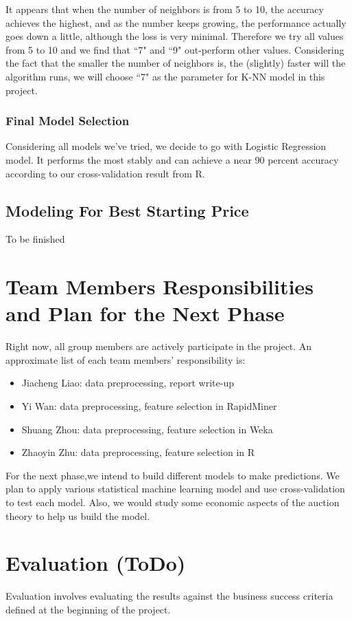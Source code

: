 \documentclass[CEJM,PDF]{cej} %
\begin{document}
It appears that when the number of neighbors is from 5 to 10, the accuracy achieves the highest, and as the number keeps growing, the performance actually goes down a little, although the loss is very minimal. Therefore we try all values from 5 to 10 and we find that ``7" and ``9" out-perform other values. Considering the fact that the smaller the number of neighbors is, the (slightly) faster will the algorithm runs, we will choose ``7" as the parameter for K-NN model in this project.\\

\subsubsection{Final Model Selection}
Considering all models we've tried, we decide to go with Logistic Regression model. It performs the most stably and can achieve a near 90 percent accuracy according to our cross-validation result from R.

\subsection{Modeling For Best Starting Price}
To be finished


\section{Team Members Responsibilities and Plan for the Next Phase}

Right now, all group members are actively participate in the project. An approximate list of each team members' responsibility is:
\begin{itemize}
\item Jiacheng Liao: data preprocessing, report write-up
\item Yi Wan: data preprocessing, feature selection in RapidMiner
\item Shuang Zhou: data preprocessing, feature selection in Weka
\item Zhaoyin Zhu: data preprocessing, feature selection in R
\end{itemize}

For the next phase,we intend to build different models to make predictions. We plan to apply various statistical machine learning model and use cross-validation to test each model. Also, we would study some economic aspects of the auction theory to help us build the model.


\section{Evaluation (ToDo)}
Evaluation involves evaluating the results against the business success criteria defined at the beginning of the project.
\end{document}
